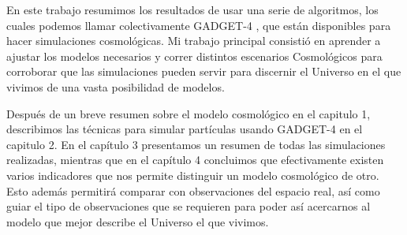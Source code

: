 En este trabajo resumimos los resultados de usar una serie de algoritmos, los cuales  podemos llamar colectivamente GADGET-4 \cite{2001NewA....6...79S,2021MNRAS.506.2871S}, que están disponibles para hacer simulaciones cosmológicas. Mi trabajo principal consistió en aprender a ajustar los modelos necesarios y correr distintos escenarios Cosmológicos para corroborar que las simulaciones pueden servir para discernir el Universo en el que vivimos de una vasta posibilidad de modelos.

Después de un breve resumen sobre el modelo cosmológico en el capitulo 1, describimos las técnicas para simular partículas usando GADGET-4 en el capitulo 2. En el capítulo 3 presentamos un resumen de todas las simulaciones realizadas, mientras que en el capítulo 4 concluimos que efectivamente existen varios indicadores que nos permite distinguir un modelo cosmológico de otro. Esto además permitirá comparar con observaciones del espacio real, así como guiar el tipo de observaciones que se requieren para poder así acercarnos al modelo que mejor describe el Universo el que vivimos.









\lhead[\fancyplain{}{}]%
      {\fancyplain{}{\bfseries\rightmark}}
